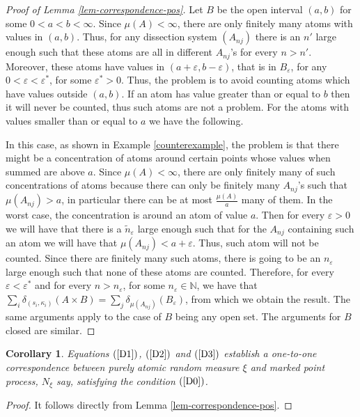 \documentclass{article}
\theoremstyle{plain}
\newtheorem{corollary}[theorem]{Corollary}
\theoremstyle{remark}
\begin{document}
\begin{proof}[Proof of Lemma \ref{lem-correspondence-pos}]
	Let $B$ be the open interval $(a,b)$ for some $0<a<b<\infty$. Since $\mu(A)<\infty$, there are only finitely many atoms with values in $(a,b)$. Thus, for any dissection system $(A_{nj})$ there is an $n'$ large enough such that these atoms are all in different $A_{nj}$'s for every $n>n'$. Moreover, these atoms have values in $(a+\varepsilon,b-\varepsilon)$, that is in $B_\varepsilon$, for any $0<\varepsilon<\varepsilon^*$, for some $\varepsilon^*>0$.  Thus, the problem is to avoid counting atoms which have values outside $(a,b)$. If an atom has value greater than or equal to $b$ then it will never be counted, thus such atoms are not a problem. For the atoms with values smaller than or equal to $a$ we have the following. 
	
	In this case, as shown in Example \ref{counterexample}, the problem is that there might be a concentration of atoms around certain points whose values when summed are above $a$. Since $\mu(A)<\infty$, there are only finitely many of such concentrations of atoms because there can only be finitely many $A_{nj}$'s such that $\mu(A_{nj})>a$, in particular there can be at most $\frac{\mu(A)}{a}$ many of them. In the worst case, the concentration is around an atom of value $a$. Then for every $\varepsilon>0$ we will have that there is a $\tilde{n}_\varepsilon$ large enough such that for the $A_{nj}$ containing such an atom we will have that $\mu(A_{nj})<a+\varepsilon$. Thus, such atom will not be counted. Since there are finitely many such atoms, there is going to be an $n_\varepsilon$ large enough such that none of these atoms are counted. Therefore, for every $\varepsilon<\varepsilon^*$ and for every $n>n_\varepsilon$, for some $n_\varepsilon\in\mathbb{N}$, we have that $\sum_{i}\delta_{(s_i,\kappa_i)}(A\times B)=\sum_{j}\delta_{\mu(A_{nj})}(B_{\varepsilon})$, from which we obtain the result. The same arguments apply to the case of $B$ being any open set. The arguments for $B$ closed are similar.
\end{proof}


\begin{corollary}\label{co-9.1.VII}
	Equations $(\ref{D1})$,  $(\ref{D2})$ and  $(\ref{D3})$ establish a one-to-one correspondence between purely atomic random measure $\xi$ and marked point process, $N_{\xi}$ say, satisfying the condition $(\ref{D0})$.
\end{corollary}
\begin{proof}
	It follows directly from Lemma \ref{lem-correspondence-pos}.
\end{proof}
\end{document}
